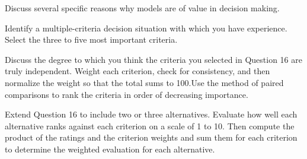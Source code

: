 \begin{exercises}
    \begin{exercise}
    \label{sea-07-15}
        Discuss several specific reasons why models are of value in decision making.
    \end{exercise}
    \begin{solution}
    \end{solution}
    
    \begin{exercise}
    \label{sea-07-16}
        Identify a multiple-criteria decision situation with which you have experience. Select the three to five most important criteria.
    \end{exercise}
    \begin{solution}
    \end{solution}
    
    \begin{exercise}
    \label{sea-07-17}
        Discuss the degree to which you think the criteria you selected in Question 16 are truly independent. Weight each criterion, check for consistency, and then normalize the weight so that the total sums to 100.Use the method of paired comparisons to rank the criteria in order of decreasing importance.
    \end{exercise}
    \begin{solution}
    \end{solution}
    
    \begin{exercise}
    \label{sea-07-18}
        Extend Question 16 to include two or three alternatives. Evaluate how well each alternative ranks against each criterion on a scale of 1 to 10. Then compute the product of the ratings and the criterion weights and sum them for each criterion to determine the weighted evaluation for each alternative.
    \end{exercise}
    \begin{solution}
    \end{solution}
    

\end{exercises}
